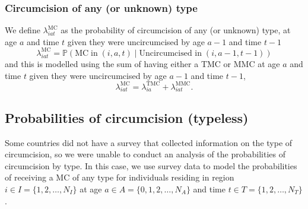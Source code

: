 \documentclass{article}
\begin{document}
\begin{appendix}

\subsubsection*{Circumcision of any (or unknown) type}


\noindent We define $\lambda^{\text{MC}}_{iat}$ as the probability of circumcision of any (or unknown) type, at age $a$ and time $t$ given they were uncircumcised by age $a-1$ and time $t-1$ 
\begin{equation*}
	\lambda^{\text{MC}}_{iat} = \mathbb{P}(\text{MC} \; \text{in} \; (i,a,t) \; | \; \text{Uncircumcised in} \; (i,a-1,t-1))
\end{equation*}
and this is modelled using the sum of having either a TMC or MMC at age $a$ and time $t$ given they were uncircumcised by age $a-1$ and time $t-1$,
\begin{equation*}
	\lambda^{\text{MC}}_{iat} = \lambda^{\text{TMC}}_{ia} + \lambda^{\text{MMC}}_{iat}. 
\end{equation*}




\subsection{Probabilities of circumcision (typeless)}
\label{sec::typeless}


Some countries did not have a survey that collected information on the type of circumcision, so we were unable to conduct an analysis of the probabilities of circumcision by type. In this case, we use survey data to model the probabilities of receiving a MC of any type for individuals residing in region $i \in I = \{1, 2, \ldots, N_I\}$ at age $a \in A = \{0, 1, 2, \ldots, N_A\}$ and time $t \in T = \{1, 2, \ldots, N_T\}$. 


\end{appendix}
\end{document}

